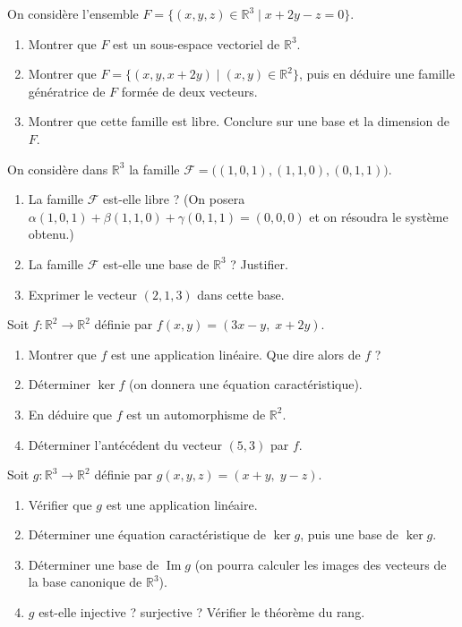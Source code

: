 \documentclass[11pt]{article}
\newcounter{popsec}
\newcounter{popsub}
\newcommand{\courssub}[1]{%
  \stepcounter{popsub}%
  \par\vspace{9pt}\noindent{\popxbold\fontsize{11.5}{13}\selectfont\color{popink}{\color{poporange}\thepopsec.\thepopsub}\hspace{6pt}#1}\par\nopagebreak\vspace{4pt}
}
\begin{document}
\courssub{Je m'entraîne}

\begin{exercice}
On considère l'ensemble $F=\{(x,y,z)\in\mathbb{R}^3 \mid x+2y-z=0\}$.
\begin{enumerate}
\item Montrer que $F$ est un sous-espace vectoriel de $\mathbb{R}^3$.
\item Montrer que $F=\{(x,y,x+2y)\mid (x,y)\in\mathbb{R}^2\}$, puis en déduire une famille génératrice de $F$ formée de deux vecteurs.
\item Montrer que cette famille est libre. Conclure sur une base et la dimension de $F$.
\end{enumerate}
\end{exercice}

\begin{exercice}
On considère dans $\mathbb{R}^3$ la famille $\mathcal{F}=\big((1,0,1),(1,1,0),(0,1,1)\big)$.
\begin{enumerate}
\item La famille $\mathcal{F}$ est-elle libre ? (On posera $\alpha(1,0,1)+\beta(1,1,0)+\gamma(0,1,1)=(0,0,0)$ et on résoudra le système obtenu.)
\item La famille $\mathcal{F}$ est-elle une base de $\mathbb{R}^3$ ? Justifier.
\item Exprimer le vecteur $(2,1,3)$ dans cette base.
\end{enumerate}
\end{exercice}

\begin{exercice}
Soit $f:\mathbb{R}^2\to\mathbb{R}^2$ définie par $f(x,y)=(3x-y,\;x+2y)$.
\begin{enumerate}
\item Montrer que $f$ est une application linéaire. Que dire alors de $f$ ?
\item Déterminer $\ker f$ (on donnera une équation caractéristique).
\item En déduire que $f$ est un automorphisme de $\mathbb{R}^2$.
\item Déterminer l'antécédent du vecteur $(5,3)$ par $f$.
\end{enumerate}
\end{exercice}

\begin{exercice}
Soit $g:\mathbb{R}^3\to\mathbb{R}^2$ définie par $g(x,y,z)=(x+y,\;y-z)$.
\begin{enumerate}
\item Vérifier que $g$ est une application linéaire.
\item Déterminer une équation caractéristique de $\ker g$, puis une base de $\ker g$.
\item Déterminer une base de $\operatorname{Im} g$ (on pourra calculer les images des vecteurs de la base canonique de $\mathbb{R}^3$).
\item $g$ est-elle injective ? surjective ? Vérifier le théorème du rang.
\end{enumerate}
\end{exercice}
\end{document}
